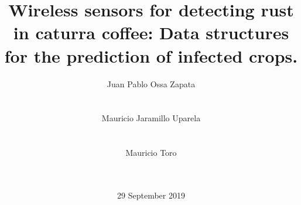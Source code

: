 \documentclass{acm_proc_article-sp}
\begin{document}
\title{Wireless sensors for detecting rust in caturra coffee: Data structures for the prediction of infected crops.}
%
%
%
%
%

%
\author{
%
%
\alignauthor
Juan Pablo Ossa Zapata\\
       \\
       \\
\alignauthor
Mauricio Jaramillo Uparela\\
       \\
       \\
\alignauthor
Mauricio Toro\\
        \\
        \\
        }
\date{29 September 2019}
\end{document}

